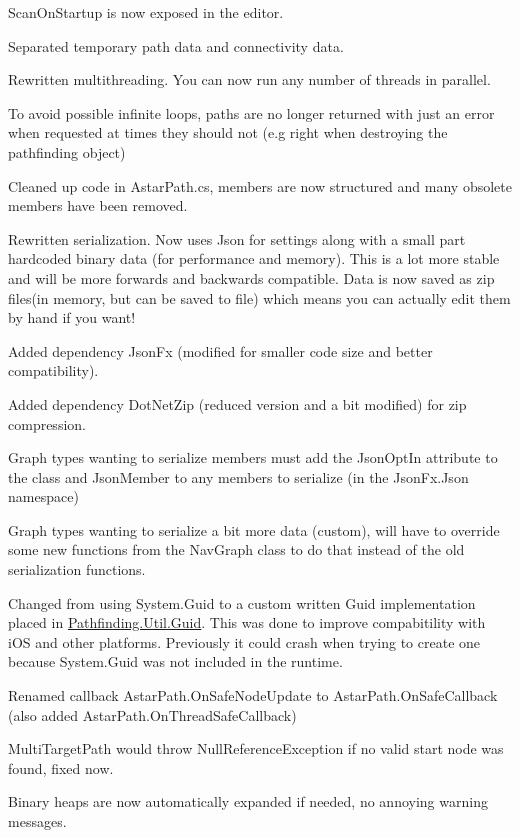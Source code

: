 \begin{DoxyItemize}
\begin{DoxyItemize}
\item Scan\+On\+Startup is now exposed in the editor.
\item Separated temporary path data and connectivity data.
\item Rewritten multithreading. You can now run any number of threads in parallel.
\item To avoid possible infinite loops, paths are no longer returned with just an error when requested at times they should not (e.\+g right when destroying the pathfinding object)
\item Cleaned up code in Astar\+Path.\+cs, members are now structured and many obsolete members have been removed.
\item Rewritten serialization. Now uses Json for settings along with a small part hardcoded binary data (for performance and memory). This is a lot more stable and will be more forwards and backwards compatible. Data is now saved as zip files(in memory, but can be saved to file) which means you can actually edit them by hand if you want!
\item Added dependency Json\+Fx (modified for smaller code size and better compatibility).
\item Added dependency Dot\+Net\+Zip (reduced version and a bit modified) for zip compression.
\item Graph types wanting to serialize members must add the Json\+Opt\+In attribute to the class and Json\+Member to any members to serialize (in the Json\+Fx.\+Json namespace)
\item Graph types wanting to serialize a bit more data (custom), will have to override some new functions from the Nav\+Graph class to do that instead of the old serialization functions.
\item Changed from using System.\+Guid to a custom written Guid implementation placed in \mbox{\hyperlink{struct_pathfinding_1_1_util_1_1_guid}{Pathfinding.\+Util.\+Guid}}. This was done to improve compabitility with i\+OS and other platforms. Previously it could crash when trying to create one because System.\+Guid was not included in the runtime.
\item Renamed callback Astar\+Path.\+On\+Safe\+Node\+Update to Astar\+Path.\+On\+Safe\+Callback (also added Astar\+Path.\+On\+Thread\+Safe\+Callback)
\item Multi\+Target\+Path would throw Null\+Reference\+Exception if no valid start node was found, fixed now.
\item Binary heaps are now automatically expanded if needed, no annoying warning messages.

\end{DoxyItemize}
\end{DoxyItemize}
